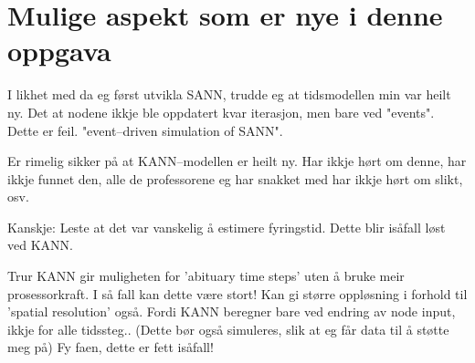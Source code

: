 




\section{ Mulige aspekt som er nye i denne oppgava }
	I likhet med da eg først utvikla SANN, trudde eg at tidsmodellen min var heilt ny. Det at nodene ikkje ble oppdatert kvar iterasjon, men bare ved "events". Dette er feil. "event--driven simulation of SANN".
	
	Er rimelig sikker på at KANN--modellen er heilt ny. Har ikkje hørt om denne, har ikkje funnet den, alle de professorene eg har snakket med har ikkje hørt om slikt, osv.
	
	Kanskje: Leste at det var vanskelig å estimere fyringstid. Dette blir isåfall løst ved KANN.

	Trur KANN gir muligheten for 'abituary time steps' uten å bruke meir prosessorkraft. I så fall kan dette være stort! Kan gi større oppløsning i forhold til 'spatial resolution' også.
	Fordi KANN beregner bare ved endring av node input, ikkje for alle tidssteg..
	(Dette bør også simuleres, slik at eg får data til å støtte meg på)  	Fy faen, dette er fett isåfall!


